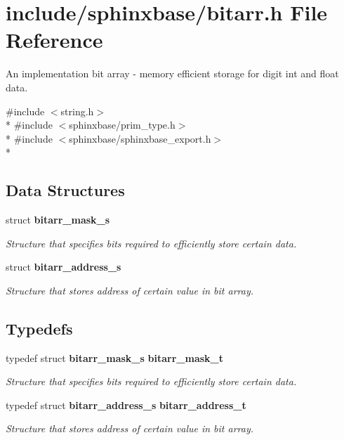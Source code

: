 \section{include/sphinxbase/bitarr.h File Reference}
\label{bitarr_8h}


An implementation bit array -\/ memory efficient storage for digit int and float data.  


{\ttfamily \#include $<$string.\-h$>$}\\*
{\ttfamily \#include $<$sphinxbase/prim\-\_\-type.\-h$>$}\\*
{\ttfamily \#include $<$sphinxbase/sphinxbase\-\_\-export.\-h$>$}\\*
\subsection*{Data Structures}
\begin{DoxyCompactItemize}
\item 
struct {\bf bitarr\-\_\-mask\-\_\-s}
\begin{DoxyCompactList}\small\item\em Structure that specifies bits required to efficiently store certain data. \end{DoxyCompactList}\item 
struct {\bf bitarr\-\_\-address\-\_\-s}
\begin{DoxyCompactList}\small\item\em Structure that stores address of certain value in bit array. \end{DoxyCompactList}\end{DoxyCompactItemize}
\subsection*{Typedefs}
\begin{DoxyCompactItemize}
\item 
typedef struct {\bf bitarr\-\_\-mask\-\_\-s} {\bf bitarr\-\_\-mask\-\_\-t}\label{bitarr_8h_aec70f3bbe9a6e403fb371ae467f71ad7}

\begin{DoxyCompactList}\small\item\em Structure that specifies bits required to efficiently store certain data. \end{DoxyCompactList}\item 
typedef struct {\bf bitarr\-\_\-address\-\_\-s} {\bf bitarr\-\_\-address\-\_\-t}\label{bitarr_8h_a45f2491b4de7575350b30cd599e4555f}

\begin{DoxyCompactList}\small\item\em Structure that stores address of certain value in bit array. \end{DoxyCompactList}\end{DoxyCompactItemize}
